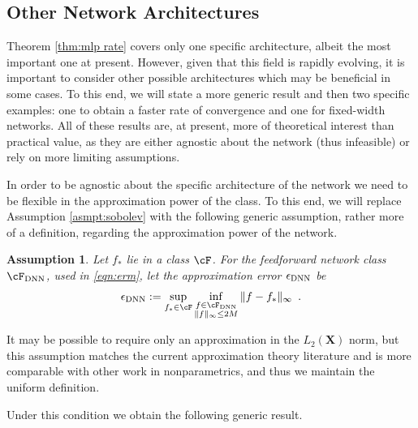 \documentclass[11pt]{article}
\newtheorem{assumption}{Assumption}
\numberwithin{equation}{section}
\theoremstyle{definition}
\newcommand{\bX}{\bm{X}}
\begin{document}
\subsection{Other Network Architectures}
	\label{sec:other rates}
	

Theorem \ref{thm:mlp rate} covers only one specific architecture, albeit the most important one at present. However, given that this field is rapidly evolving, it is important to consider other possible architectures which may be beneficial in some cases. To this end, we will state a more generic result and then two specific examples: one to obtain a faster rate of convergence and one for fixed-width networks. All of these results are, at present, more of theoretical interest than practical value, as they are either agnostic about the network (thus infeasible) or rely on more limiting assumptions.


In order to be agnostic about the specific architecture of the network we need to be flexible in the approximation power of the class. To this end, we will replace Assumption \ref{asmpt:sobolev} with the following generic assumption, rather more of a definition, regarding the approximation power of the network. 
\begin{assumption}
	\label{asmpt:bias}
	Let $f_*$ lie in a class $\cF$. For the feedforward network class $\cF_{\rm DNN}$, used in \eqref{eqn:erm}, let the approximation error $\epsilon_{\rm DNN}$ be
	\begin{equation*}
		\epsilon_{\rm DNN} := \sup_{f_* \in \cF} \inf_{\substack{f \in \cF_{\rm DNN} \\ \| f\|_\infty \leq 2M}} \| f -  f_* \|_\infty \enspace.
	\end{equation*}
\end{assumption}
It may be possible to require only an approximation in the $L_2(\bX)$ norm, but this assumption matches the current approximation theory literature and is more comparable with other work in nonparametrics, and thus we maintain the uniform definition. 

Under this condition we obtain the following generic result.
\end{document}
